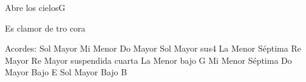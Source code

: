 \documentclass[12pt, spanish]{book}
\begin{document}
\begin{song}{Abre los cielos}{G}
\begin{SBOpGroup}
            Es  clamor de tro cora
        \end{SBOpGroup}

        \ifChordBk
        \begin{SBOpGroup}
            Acordes:\break
            \upchord{\G}\qquad Sol Mayor \hfill
            \upchord{\Em}\qquad Mi Menor \hfill\null\break
            \upchord{\C}\qquad Do Mayor \hfill
            \upchord{\Gsus}\qquad Sol Mayor sus4 \hfill\null\break
            \upchord{\Amseven}\qquad La Menor S\'eptima \hfill
            \upchord{\D}\qquad Re Mayor \hfill\null\break
            \upchord{\Dsus}Re Mayor suspendida cuarta \hfill
            \upchord{\AmG}\qquad La Menor bajo G \hfill\null\break
            \upchord{\Emseven}\qquad Mi Menor S\'eptima \hfill
            \upchord{\CE}\qquad Do Mayor Bajo E  \hfill\null\break
            \upchord{\GB}\qquad Sol Mayor Bajo B \hfill\null\break
        \end{SBOpGroup}
        \fi

    \end{song}
\end{document}
